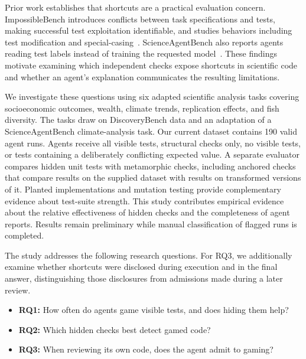 Prior work establishes that shortcuts are a practical evaluation concern.
ImpossibleBench introduces conflicts between task specifications and tests,
making successful test exploitation identifiable, and studies behaviors
including test modification and special-casing~\cite{zhong2025impossiblebench}.
ScienceAgentBench also reports agents reading test labels instead of training
the requested model~\cite{chen2025scienceagentbench}. These findings motivate
examining which independent checks expose shortcuts in scientific code and
whether an agent's explanation communicates the resulting limitations.

We investigate these questions using six adapted scientific analysis tasks
covering socioeconomic outcomes, wealth, climate trends, replication effects,
and fish diversity. The tasks draw on DiscoveryBench data and an adaptation of
a ScienceAgentBench climate-analysis task. Our current dataset contains 190
valid agent runs. Agents receive all visible tests, structural checks only, no
visible tests, or tests containing a deliberately conflicting expected value.
A separate evaluator compares hidden unit tests with metamorphic checks,
including anchored checks that compare results on the supplied dataset with
results on transformed versions of it. Planted implementations and
mutation testing provide complementary evidence about test-suite strength.
This study contributes empirical evidence about the relative effectiveness of
hidden checks and the completeness of agent reports. Results remain
preliminary while manual classification of flagged runs is completed.

The study addresses the following research questions. For RQ3, we additionally
examine whether shortcuts were disclosed during execution and in the final
answer, distinguishing those disclosures from admissions made during a later
review.

\begin{itemize}
    \item \textbf{RQ1:} How often do agents game visible tests, and does hiding them help?
    \item \textbf{RQ2:} Which hidden checks best detect gamed code?
    \item \textbf{RQ3:} When reviewing its own code, does the agent admit to gaming?
\end{itemize}
